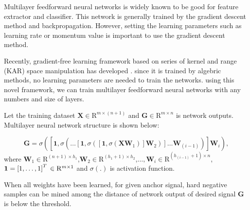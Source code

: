 \documentclass[runningheads]{llncs}
\begin{document}
Multilayer feedforward neural networks is widely known to be good for feature extractor and classifier.
This network is generally trained by the gradient descent method and backpropagation.
However, setting the learning parameters such as learning rate or momentum value is important to use the gradient descent method. 



Recently, gradient-free learning framework based on series of kernel and range (KAR) space manipulation has developed \cite{toh2018learning,toh2018gradient}.
since it is trained by algebric methods, no learning parameters are needed to train the networks.
using this novel framework, we can train multilayer feedforward neural networks with any numbers and size of layers.

Let the training dataset $\mathbf{X}\in{\mathrm{R}}^{m \times (n+1)}$ and $\mathbf{G}\in{\mathrm{R}}^{m \times n}$ is network outputs.
Multilayer neural network structure is shown below:

\begin{equation}
    \mathbf{G} = \sigma\left(\left[\mathbf{1},\sigma\left(\dots\left[\mathbf{1},\sigma\left(\left[\mathbf{1},\sigma\left(\mathbf{X}\mathbf{W}_{1}\right)\right]\mathbf{W}_{2}\right)\right]\dots\mathbf{W}_{(i-1)}\right)\right]\mathbf{W}_{i}\right),
\end{equation}
where $\mathbf{W}_{1}\in{\mathrm{R}}^{(n+1) \times h_{1}}$,$\mathbf{W}_{2}\in{\mathrm{R}}^{(h_{1}+1) \times h_{2}}$,$\dots,\mathbf{W}_{i}\in{\mathrm{R}}^{(h_{(i-1)}+1) \times n}$,$\mathbf{1}=\left[1,\dots,1\right]^{T}\\
\in{\mathrm{R}}^{m \times 1}$ and $\sigma(.)$ is activation function.

When all weights have been learned, for given anchor signal, hard negative samples can be mined among the distance of network output of desired signal $\mathbf{G}$ is below the threshold.
\end{document}
